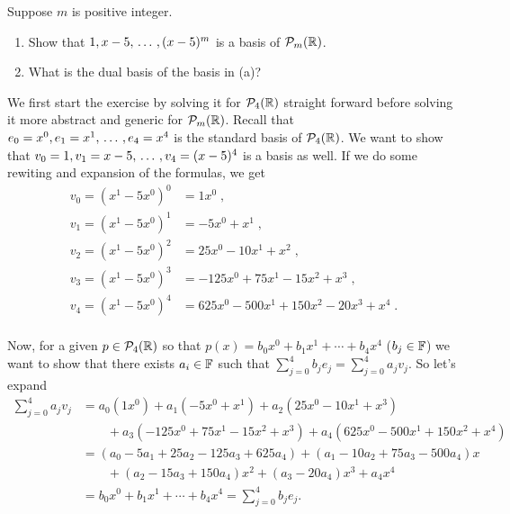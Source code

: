 \begin{xrcs}
  Suppose $m$ is positive integer.
  \begin{enumerate}
    \item Show that $1, x-5, {\, \ldots \,\,}, (x-5)^m$ is a basis of $\mathcal{P}_m(\mathbb{R})$.
    \item What is the dual basis of the basis in (a)?
  \end{enumerate}
  \begin{xsol}
    We first start the exercise by solving it for $\mathcal{P}_4(\mathbb{R})$ straight forward before solving it more abstract and generic for $\mathcal{P}_m(\mathbb{R})$. Recall that $e_0 = x^0, e_1 = x^1, {\, \ldots \,\,}, e_4 = x^4$ is the standard basis of $\mathcal{P}_4(\mathbb{R})$. We want to show that $v_0 = 1, v_1 = x-5, {\, \ldots \,\,}, v_4 = (x-5)^4$ is a basis as well. If we do some rewiting and expansion of the formulas, we get
    \begin{equation}
      \begin{aligned}
        v_0 = (x^1-5x^0)^0 &= 1x^0 \;,\\
        v_1 = (x^1-5x^0)^1 &= -5x^0+x^1 \;,\\
        v_2 = (x^1-5x^0)^2 &= 25x^0-10x^1+x^2 \;,\\
        v_3 = (x^1-5x^0)^3 &= -125x^0+75x^1-15x^2+x^3 \;,\\
        v_4 = (x^1-5x^0)^4 &= 625x^0-500x^1+150x^2-20x^3+x^4 \;.\\
      \end{aligned}
    \end{equation}

    Now, for a given $p \in \mathcal{P}_4(\mathbb{R})$ so that $p(x) = b_0 x^0 + b_1 x^1 + \cdots + b_4 x^4$ ($b_j \in \mathbb{F}$) we want to show that there exists $a_i \in \mathbb{F}$ such that $\sum_{j=0}^{4} b_j e_j = \sum_{j=0}^{4} a_j v_j$. So let's expand
    \begin{equation}
      \begin{aligned}
        \textstyle
        \sum_{j=0}^{4} a_j v_j
          &= a_0 (1x^0) + a_1 (-5x^0+x^1) + a_2 (25x^0-10x^1+x^3) \\
          &  \qquad + a_3 (-125x^0+75x^1-15x^2+x^3) + a_4 (625x^0-500x^1+150x^2+x^4) \\
          &= (a_0 - 5a_1 + 25 a_2 - 125 a_3 + 625 a_4) + (a_1 -10 a_2 + 75 a_3 - 500 a_4) x\\
          & \qquad + (a_2 - 15 a_3 + 150 a_4) x^2 + (a_3 - 20 a_4) x^3 + a_4 x^4 \\
          &= b_0 x^0 + b_1 x^1 + \cdots + b_4 x^4 = \textstyle \sum_{j=0}^{4} b_j e_j.
      \end{aligned}
    \end{equation}


\end{xsol}
\end{xrcs}
